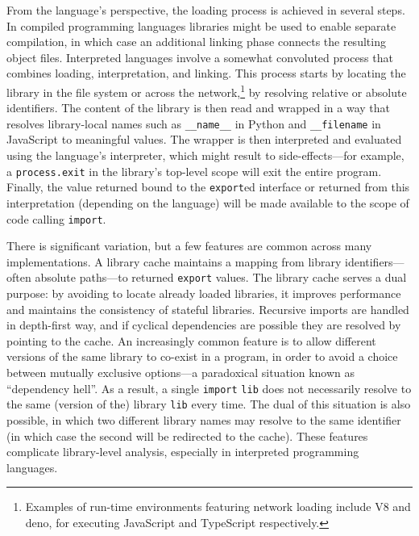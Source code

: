 \documentclass[letterpaper,twocolumn,10pt]{article}
\newcommand{\ttt}[1]{\texttt{#1}}
\begin{document}
From the language's perspective, the loading process is achieved in several steps. 
In compiled programming languages libraries might be used to enable separate compilation, in which case an additional linking phase connects the resulting object files.
Interpreted languages involve a somewhat convoluted process that combines loading, interpretation, and linking.
This process starts by locating the library in the file system or across the network,\footnote{
  Examples of run-time environments featuring network loading include V8 and deno, for executing JavaScript and TypeScript respectively.
}
by resolving relative or absolute identifiers.
The content of the library is then read and wrapped in a way that resolves library-local names such as \ttt{\_\_name\_\_} in Python and \ttt{\_\_filename} in JavaScript to meaningful values.
The wrapper is then interpreted and evaluated using the language's interpreter, which might result to side-effects---for example, a \ttt{process.exit} in the library's top-level scope will exit the entire program.
Finally, the value returned bound to the \ttt{export}ed interface or returned from this interpretation (depending on the language) will be made available to the scope of code calling \ttt{import}.

There is significant variation, but a few features are common across many implementations.
A library cache maintains a mapping from library identifiers---often absolute paths---to returned \ttt{export} values.
The library cache serves a dual purpose:
  by avoiding to locate already loaded libraries, it improves performance and maintains the consistency of stateful libraries.
Recursive imports are handled in depth-first way, and if cyclical dependencies are possible they are resolved by pointing to the cache.
An increasingly common feature is to allow different versions of the same library to co-exist in a program, in order to avoid a choice between mutually exclusive options---a paradoxical situation known as ``dependency hell''.
As a result, a single \ttt{import} \ttt{lib} does not necessarily resolve to the same (version of the) library \ttt{lib} every time.
The dual of this situation is also possible, in which two different library names may resolve to the same identifier (in which case the second will be redirected to the cache).
These features complicate library-level analysis, especially in interpreted programming languages.


\end{document}
